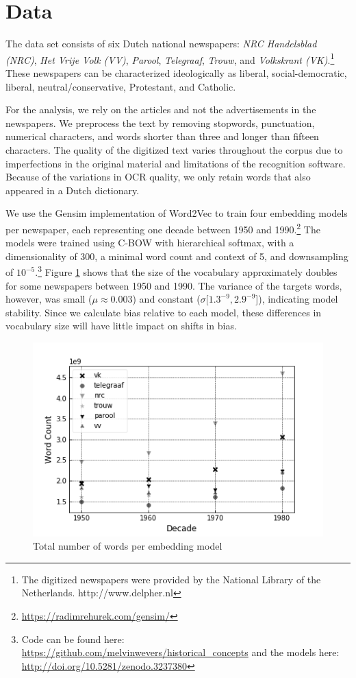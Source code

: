 \documentclass[11pt,a4paper]{article}
\begin{document}
\section{Data}
The data set consists of six Dutch national newspapers: \textit{NRC Handelsblad (NRC)}, \textit{Het Vrije Volk (VV)}, \textit{Parool}, \textit{Telegraaf}, \textit{Trouw}, and \textit{Volkskrant (VK)}.\footnote{ The digitized newspapers were provided by the National Library of the Netherlands. http://www.delpher.nl} These newspapers can be characterized ideologically as liberal, social-democratic, liberal, neutral/conservative, Protestant, and Catholic.

For the analysis, we rely on the articles and not the advertisements in the newspapers. We preprocess the text by removing stopwords, punctuation, numerical characters, and words shorter than three and longer than fifteen characters. 
The quality of the digitized text varies throughout the corpus due to imperfections in the original material and limitations of the recognition software. Because of the variations in OCR quality, we only retain words that also appeared in a Dutch dictionary.

We use the Gensim implementation of Word2Vec to train four embedding models per newspaper, each representing one decade between 1950 and 1990.\footnote{\url{https://radimrehurek.com/gensim/}} The models were trained using C-BOW with hierarchical softmax, with a dimensionality of 300, a minimal word count and context of 5, and downsampling of $10^{-5}$.\footnote{Code can be found here: \url{https://github.com/melvinwevers/historical_concepts} and the models here: \url{http://doi.org/10.5281/zenodo.3237380}} Figure \ref{fig:vocab-size} shows that the size of the vocabulary approximately doubles for some newspapers between 1950 and 1990. The variance of the targets words, however, was small ($\mu \approx 0.003$) and constant ($\sigma [1.3^{-9}, 2.9^{-9}$]), indicating model stability. Since we calculate bias relative to each model, these differences in vocabulary size will have little impact on shifts in bias.

\begin{figure}
  \includegraphics[width=\linewidth]{figures/vocab_size}
  \caption{Total number of words per embedding model}
  \label{fig:vocab-size}
\end{figure}
\end{document}
